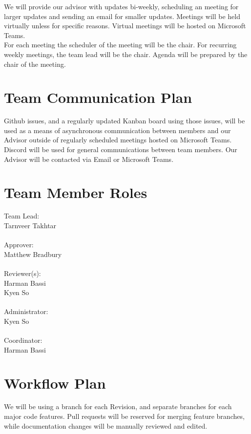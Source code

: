 \documentclass{article}
\begin{document}
We will provide our advisor with updates bi-weekly, scheduling an meeting
for larger updates and sending an email for smaller updates. Meetings will
be held virtually unless for specific reasons. Virtual meetings will be hosted on
Microsoft Teams.\\

For each meeting the scheduler of the meeting will be the chair. 
For recurring weekly meetings, the team lead will be the chair. 
Agenda will be prepared by the chair of the meeting.

\section{Team Communication Plan}

Github issues, and a regularly updated Kanban board using those issues, will be used as a means of asynchronous communication 
between members and our Advisor outside of regularly scheduled meetings hosted on Microsoft Teams. 
Discord will be used for general communications between team members. Our Advisor will be contacted via Email or Microsoft Teams.

\section{Team Member Roles}
\noindent Team Lead:\\
Tarnveer Takhtar\\
\\
Approver:\\
Matthew Bradbury\\
\\
Reviewer(s):\\
Harman Bassi\\
Kyen So\\
\\
Administrator:\\
Kyen So\\
\\
Coordinator:\\
Harman Bassi\\

\section{Workflow Plan}

We will be using a branch for each Revision, and separate branches for each
major code features. Pull requests will be reserved for merging feature branches,
while documentation changes will be manually reviewed and edited.\\
\end{document}
